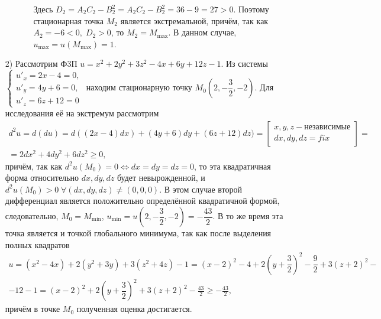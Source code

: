 \documentclass[../../main.tex]{subfiles}
\begin{document}
\begin{itemize}
\begin{itemize}
\begin{itemize}
                Здесь $D_2 = A_2C_2 - B_2^2 =
                A_2C_2 - B_2^2 = 36 - 9 = 27 > 0$. Поэтому стационарная
                точка $M_2$ является экстремальной, причём, так как $A_2 = -6 <
                0, \; D_2 > 0$, то $M_2 = M_{\max}$. В данном случае,
                $u_{\max} = u(M_{\max}) = 1$.
            \end{itemize}
        \end{itemize}
        \item[2)] Рассмотрим Ф3П $u = x^2 + 2y^2 + 3z^2 - 4x + 6y +12z-1$.
        Из системы
        $\begin{cases}
            u'_x = 2x-4 = 0, \\
            u'_y = 4y+6 = 0, \\
            u'_z = 6z+12 = 0
        \end{cases}$ находим стационарную точку $M_0\left(2, -\dfrac32,
        -2\right)$. Для исследования её на экстремум рассмотрим
        \begin{multline*}
            d^2u = d(du) = d((2x-4)dx)+(4y+6)dy+(6z+12)dz) =
            \left[
                \begin{gathered}
                    x, y, z - \text{независимые} \\
                    dx, dy, dz = fix
                \end{gathered}
            \right] = \\ = 2dx^2 + 4dy^2 + 6dz^2 \geq 0,
        \end{multline*}
        причём, так как $d^2u(M_0)=0 \iff dx=dy=dz=0$, то эта квадратичная
        форма относительно $dx, dy, dz$ будет невырожденной, и $d^2u(M_0)>0
        \; \forall (dx, dy, dz) \ne (0,0,0)$. В этом случае второй
        дифференциал является положительно определённой квадратичной формой,
        следовательно, $M_0 = M_{\min}$, $u_{\min} = u\left(2, -\dfrac32,
        -2\right) = -\dfrac{43}2$. В то же время эта точка является и точкой
        глобального минимума, так как после выделения полных квадратов
        \begin{multline*}
            u = (x^2-4x) + 2(y^2+3y) + 3(z^2+4z)-1 = (x-2)^2 - 4 + 2\left(y+
            \dfrac32\right)^2 - \dfrac92 + 3(z+2)^2 -\\- 12 - 1 = (x-2)^2 +
            2\left(y+\dfrac32\right)^2 + 3(z+2)^2 - \frac{43}2 \geq -\frac{43}2,
        \end{multline*}
        причём в точке $M_0$ полученная оценка достигается.
    \end{itemize}
\end{document}

